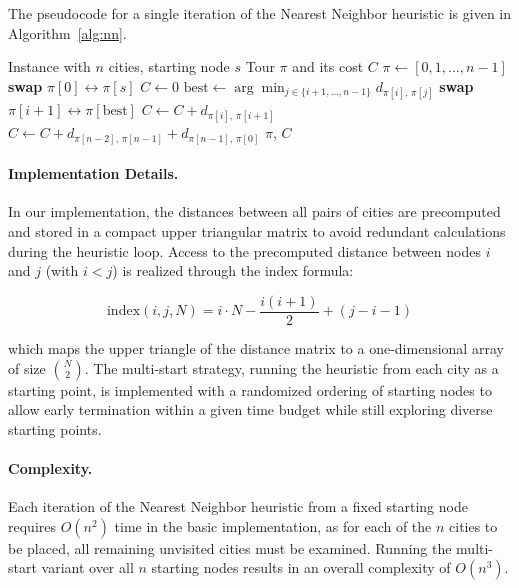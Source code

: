 \documentclass{article}
\begin{document}
The pseudocode for a single iteration of the Nearest Neighbor heuristic is given in
Algorithm~\ref{alg:nn}.

\begin{algorithm}[H]
\caption{Nearest Neighbor Heuristic (single starting node)}
\label{alg:nn}
\begin{algorithmic}[1]
\Require Instance with $n$ cities, starting node $s$
\Ensure Tour $\pi$ and its cost $C$
\State $\pi \leftarrow [0, 1, \dots, n{-}1]$
\State \textbf{swap} $\pi[0] \leftrightarrow \pi[s]$
\State $C \leftarrow 0$
    \State $\text{best} \leftarrow \arg\min_{j \in \{i+1,\dots,n-1\}} d_{\pi[i],\,\pi[j]}$
    \State \textbf{swap} $\pi[i{+}1] \leftrightarrow \pi[\text{best}]$
    \State $C \leftarrow C + d_{\pi[i],\,\pi[i+1]}$
\EndFor
\State $C \leftarrow C + d_{\pi[n-2],\,\pi[n-1]} + d_{\pi[n-1],\,\pi[0]}$ 
\State \Return $\pi$, $C$
\end{algorithmic}
\end{algorithm}

\paragraph{Implementation Details.}
In our implementation, the distances between all pairs of cities are precomputed and stored
in a compact upper triangular matrix to avoid redundant calculations during the heuristic
loop. Access to the precomputed distance between nodes $i$ and $j$ (with $i < j$) is
realized through the index formula:

\[
\text{index}(i, j, N) = i \cdot N - \frac{i(i+1)}{2} + (j - i - 1)
\]

which maps the upper triangle of the distance matrix to a one-dimensional array of size
$\binom{N}{2}$. The multi-start strategy, running the heuristic from each city as a
starting point, is implemented with a randomized ordering of starting nodes to allow
early termination within a given time budget while still exploring diverse starting points.

\paragraph{Complexity.}
Each iteration of the Nearest Neighbor heuristic from a fixed starting node requires $O(n^2)$
time in the basic implementation, as for each of the $n$ cities to be placed, all remaining
unvisited cities must be examined. Running the multi-start variant over all $n$ starting
nodes results in an overall complexity of $O(n^3)$.
\end{document}
